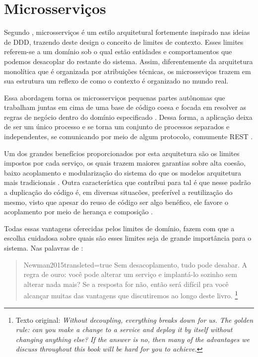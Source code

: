 \section{Microsserviços}

Segundo , microsserviços é um estilo
arquitetural fortemente inspirado nas ideias de \gls{DDD}, trazendo deste design o conceito de limites
de contexto. Esses limites referem-se a um domínio sob o qual estão entidades e comportamentos que
podemos desacoplar do restante do sistema. Assim, diferentemente da arquitetura monolítica que é
organizada por atribuições técnicas, os microsseviços trazem em sua estrutura um reflexo de como o
contexto é organizado no mundo real.

Essa abordagem torna os microsserviços pequenas partes autônomas que trabalham juntas em cima de uma
base de código coesa e focada em resolver as regras de negócio dentro do domínio especificado
\cite{Newman2015}. Dessa forma, a aplicação deixa de ser um único processo e se torna um conjunto
de processos separados e independentes, se comunicando por meio de algum protocolo, comumente
\gls{REST} \cite{MartinFowler:Microservices}.

Um dos grandes benefícios proporcionados por esta arquitetura são os limites impostos por cada
serviço, os quais trazem maiores garantias sobre alta coesão, baixo acoplamento e modularização do
sistema do que os modelos arquitetura mais tradicionais \cite{MartinFowler:MicroserviceTradeOffs}.
Outra característica que contríbui para tal é que nesse padrão a duplicação do código é, em diversas
situacões, preferível a reutilização do mesmo, visto que apesar do reuso de código ser algo
benéfico, ele favore o acoplamento por meio de herança e composição
\cite{Richards2020:FundamentalsOfSoftwareArchitecture}.

Todas essas vantagens oferecidas pelos limites de domínio, fazem com que a
escolha cuidadosa sobre quais são esses limites seja de grande importância para o sistema. Nas
palavras de :

\begin{quotation}{Newman2015}{transleted=true}
    Sem desacoplamento, tudo pode desabar. A regra de ouro: você pode alterar um serviço e
    implantá-lo sozinho sem alterar nada mais? Se a resposta for não, então será difícil pra você
    alcançar muitas das vantagens que discutiremos ao longo deste livro.  \footnote{Texto original:
    \textit{Without decoupling, everything breaks down for us. The golden
    rule: can you make a change to a service and deploy it by itself without changing anything else?
    If the answer is no, then many of the advantages we discuss throughout this book will be hard for
    you to achieve. }}
\end{quotation}

